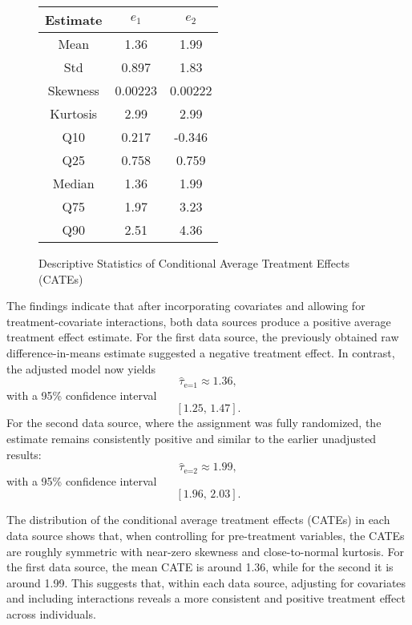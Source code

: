 \documentclass{article}
\begin{document}
\begin{figure}
  \begin{center}
    \renewcommand{\arraystretch}{1.5}
    \begin{tabular}{|c|c|c|}
      \hline
      \textbf{Estimate} & $e_1$ & $e_2$ \\ \hline
      Mean     & 1.36    &  1.99    \\ \hline
      Std      & 0.897   &  1.83    \\ \hline
      Skewness & 0.00223 &  0.00222 \\ \hline
      Kurtosis & 2.99    &  2.99    \\ \hline
      Q10      & 0.217   & -0.346   \\ \hline
      Q25      & 0.758   &  0.759   \\ \hline
      Median   & 1.36    &  1.99    \\ \hline
      Q75      & 1.97    &  3.23    \\ \hline
      Q90      & 2.51    &  4.36    \\ \hline
    \end{tabular}
  \end{center}
  \caption{Descriptive Statistics of Conditional Average Treatment Effects (CATEs)}
\end{figure}

The findings indicate that after incorporating covariates and allowing for treatment-covariate interactions, both data sources produce a positive average treatment effect estimate. For the first data source, the previously obtained raw difference-in-means estimate suggested a negative treatment effect. In contrast, the adjusted model now yields 
\[
\widehat{\tau}_{\text{e=1}} \approx 1.36,
\]
with a 95\% confidence interval 
\[
[1.25,\, 1.47].
\]
For the second data source, where the assignment was fully randomized, the estimate remains consistently positive and similar to the earlier unadjusted results:
\[
\widehat{\tau}_{\text{e=2}} \approx 1.99,
\]
with a 95\% confidence interval 
\[
[1.96,\, 2.03].
\]

The distribution of the conditional average treatment effects (CATEs) in each data source shows that, when controlling for pre-treatment variables, the CATEs are roughly symmetric with near-zero skewness and close-to-normal kurtosis. For the first data source, the mean CATE is around 1.36, while for the second it is around 1.99. This suggests that, within each data source, adjusting for covariates and including interactions reveals a more consistent and positive treatment effect across individuals.
\end{document}
